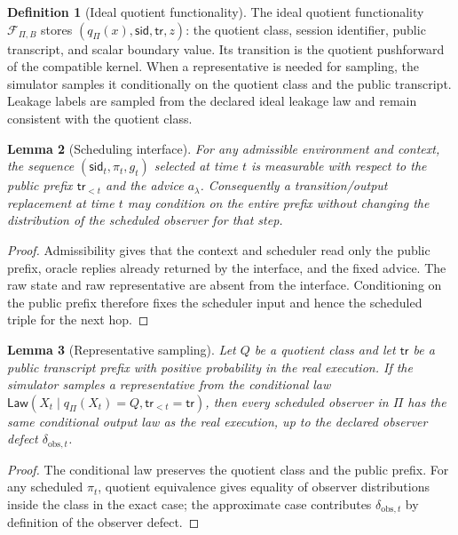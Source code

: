 \documentclass[11pt]{article}
\theoremstyle{definition}
\newtheorem{definition}{Definition}[section]
\theoremstyle{plain}
\newtheorem{lemma}[definition]{Lemma}
\theoremstyle{remark}
\begin{document}
\begin{definition}[Ideal quotient functionality]
The ideal quotient functionality $\mathcal F_{\Pi,B}$ stores $(q_\Pi(x),\mathsf{sid},\mathsf{tr},z)$: the quotient class, session identifier, public transcript, and scalar boundary value. Its transition is the quotient pushforward of the compatible kernel. When a representative is needed for sampling, the simulator samples it conditionally on the quotient class and the public transcript. Leakage labels are sampled from the declared ideal leakage law and remain consistent with the quotient class.
\end{definition}

\begin{lemma}[Scheduling interface]
For any admissible environment and context, the sequence $(\mathsf{sid}_t,\pi_t,g_t)$ selected at time $t$ is measurable with respect to the public prefix $\mathsf{tr}_{<t}$ and the advice $a_\lambda$. Consequently a transition/output replacement at time $t$ may condition on the entire prefix without changing the distribution of the scheduled observer for that step.
\end{lemma}

\begin{proof}
Admissibility gives that the context and scheduler read only the public prefix, oracle replies already returned by the interface, and the fixed advice. The raw state and raw representative are absent from the interface. Conditioning on the public prefix therefore fixes the scheduler input and hence the scheduled triple for the next hop.
\end{proof}

\begin{lemma}[Representative sampling]
Let $Q$ be a quotient class and let $\mathsf{tr}$ be a public transcript prefix with positive probability in the real execution. If the simulator samples a representative from the conditional law $\mathsf{Law}(X_t\mid q_\Pi(X_t)=Q,\mathsf{tr}_{<t}=\mathsf{tr})$, then every scheduled observer in $\Pi$ has the same conditional output law as the real execution, up to the declared observer defect $\delta_{\mathrm{obs},t}$.
\end{lemma}

\begin{proof}
The conditional law preserves the quotient class and the public prefix. For any scheduled $\pi_t$, quotient equivalence gives equality of observer distributions inside the class in the exact case; the approximate case contributes $\delta_{\mathrm{obs},t}$ by definition of the observer defect.
\end{proof}
\end{document}
